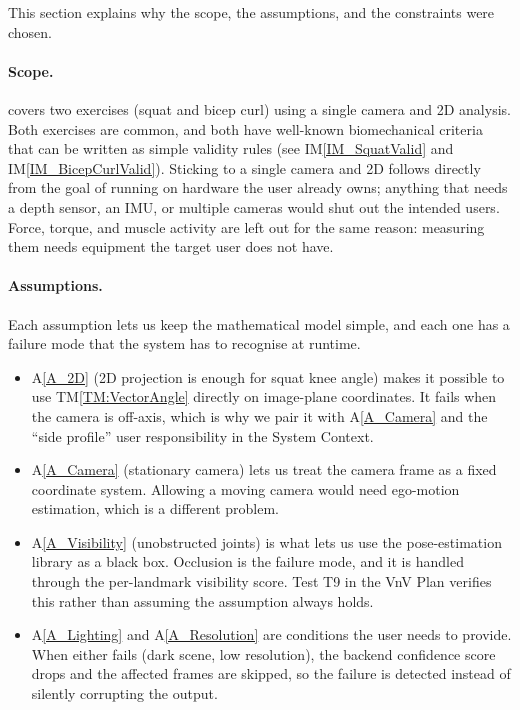 \documentclass[12pt]{article}
\newcommand{\tref}[1]{TM\ref{#1}}
\newcommand{\aref}[1]{A\ref{#1}}
\newcommand{\iref}[1]{IM\ref{#1}}
\begin{document}
This section explains why the scope, the assumptions, and the
constraints were chosen.

\paragraph{Scope.}
\progname{} covers two exercises (squat and bicep curl) using a single
camera and 2D analysis. Both exercises are common, and both have
well-known biomechanical criteria that can be written as simple
validity rules (see \iref{IM_SquatValid} and \iref{IM_BicepCurlValid}).
Sticking to a single camera and 2D follows directly from the goal of
running on hardware the user already owns; anything that needs a depth
sensor, an IMU, or multiple cameras would shut out the intended users.
Force, torque, and muscle activity are left out for the same reason:
measuring them needs equipment the target user does not have.

\paragraph{Assumptions.}
Each assumption lets us keep the mathematical model simple, and each
one has a failure mode that the system has to recognise at runtime.
\begin{itemize}
  \item \aref{A_2D} (2D projection is enough for squat knee angle)
    makes it possible to use \tref{TM:VectorAngle} directly on
    image-plane coordinates. It fails when the camera is off-axis,
    which is why we pair it with \aref{A_Camera} and the ``side
    profile'' user responsibility in the System Context.
  \item \aref{A_Camera} (stationary camera) lets us treat the camera
    frame as a fixed coordinate system. Allowing a moving camera would
    need ego-motion estimation, which is a different problem.
  \item \aref{A_Visibility} (unobstructed joints) is what lets us use
    the pose-estimation library as a black box. Occlusion is the
    failure mode, and it is handled through the per-landmark
    visibility score. Test T9 in the VnV Plan verifies this rather
    than assuming the assumption always holds.
  \item \aref{A_Lighting} and \aref{A_Resolution} are conditions the
    user needs to provide. When either fails (dark scene, low
    resolution), the backend confidence score drops and the affected
    frames are skipped, so the failure is detected instead of silently
    corrupting the output.
\end{itemize}
\end{document}
